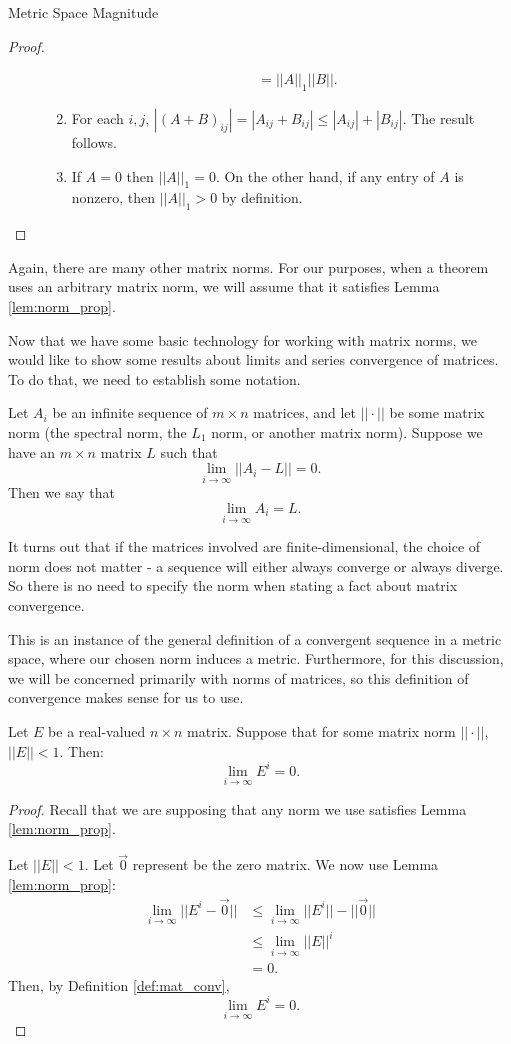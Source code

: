 \documentclass[12pt]{pom_thesis}
\begin{document}
\begin{chapter}{Metric Space Magnitude}
\begin{proof}
\begin{description}
\begin{enumerate}
\begin{align*}
&= ||A||_1||B||.
\end{align*}
\item For each $i,j$, $|(A + B)_{ij}| = |A_{ij} + B_{ij}| \leq |A_{ij}| + |B_{ij}|$. The result follows.
\item If $A=0$ then $||A||_1=0$. On the other hand, if any entry of $A$ is nonzero, then $||A||_1 > 0$ by definition.
\end{enumerate}
\end{description}
\end{proof}
Again, there are many other matrix norms. For our purposes, when a theorem uses an arbitrary matrix norm, we will assume that it satisfies Lemma \ref{lem:norm_prop}. 

Now that we have some basic technology for working with matrix norms, we would like to show some results about limits and series convergence of matrices. To do that, we need to establish some notation. 
\begin{defn}\label{def:mat_conv}
Let $A_i$ be an infinite sequence of $m \times n$ matrices, and let $||\cdot||$ be some matrix norm (the spectral norm, the $L_1$ norm, or another matrix norm). Suppose we have an $m \times n$ matrix $L$ such that 
\[
\lim_{i \rightarrow \infty} ||A_i - L|| = 0.
\]
Then we say that 
\[
\lim_{i \rightarrow \infty} A_i = L.
\]
\end{defn}
It turns out that if the matrices involved are finite-dimensional, the choice of norm does not matter - a sequence will either always converge or always diverge. So there is no need to specify the norm when stating a fact about matrix convergence.

This is an instance of the general definition of a convergent sequence in a metric space, where our chosen norm induces a metric. Furthermore, for this discussion, we will be concerned primarily with norms of matrices, so this definition of convergence makes sense for us to use.

\begin{lemma}\label{lem:lim0}
Let $E$ be a real-valued $n \times n$ matrix.  Suppose that for some matrix norm $||\cdot||$, $||E|| < 1$. Then:
\[
\lim_{i \rightarrow \infty}E^i = 0.
\]
\end{lemma}
\begin{proof}
Recall that we are supposing that any norm we use satisfies Lemma \ref{lem:norm_prop}.

Let $||E|| < 1$. Let $\vec{0}$ represent be the zero matrix. We now use Lemma \ref{lem:norm_prop}:
\begin{align*}
\lim_{i \rightarrow \infty}|| E^i - \vec{0}|| &\leq \lim_{i \rightarrow \infty}|| E^i|| - ||\vec{0}|| \\
&\leq \lim_{i \rightarrow \infty}|| E||^i\\
&= 0.
\end{align*}
Then, by Definition \ref{def:mat_conv},
\[
\lim_{i \rightarrow \infty} E^i = 0.
\]
\end{proof}


\end{chapter}
\end{document}

